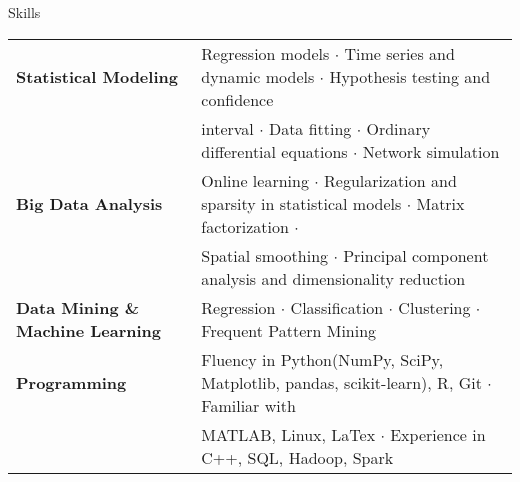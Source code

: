 \documentclass{my_resume} %
\begin{document}
\begin{rSection}{Skills}

\begin{tabular}{ @{} >{\bfseries}l @{\hspace{6ex}} l }
  Statistical Modeling & Regression models {$\cdot$} Time series and
  dynamic models {$\cdot$} Hypothesis testing and confidence \\
  & interval {$\cdot$} Data fitting {$\cdot$} Ordinary differential
  equations {$\cdot$} Network simulation\\
  Big Data Analysis & Online learning {$\cdot$} Regularization and sparsity in
  statistical models {$\cdot$} Matrix factorization {$\cdot$}\\
  & Spatial smoothing {$\cdot$} Principal component analysis and
  dimensionality reduction\\
  Data Mining \& Machine Learning & Regression {$\cdot$} Classification
  {$\cdot$} Clustering {$\cdot$} Frequent Pattern Mining\\
  Programming & Fluency in Python(NumPy, SciPy, Matplotlib, pandas,
  scikit-learn), R, Git {$\cdot$} Familiar with \\
  & MATLAB, Linux, LaTex {$\cdot$} Experience in C++, SQL, Hadoop, Spark\\
\end{tabular}
\end{rSection}



\end{document}

